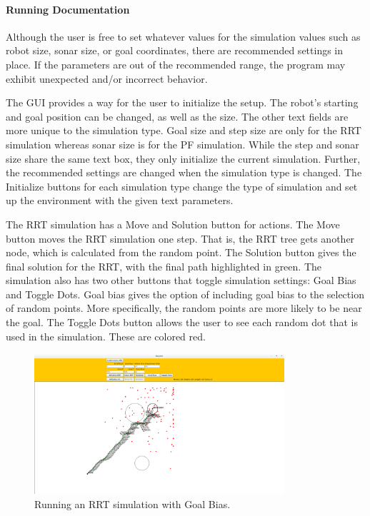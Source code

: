 \documentclass[12pt]{article}
\begin{document}
\paragraph*{Running Documentation}
Although the user is free to set whatever values for the simulation values such as robot size, sonar size, or goal coordinates, there are recommended settings in place. If the parameters are out of the recommended range, the program may exhibit unexpected and/or incorrect behavior.

The GUI provides a way for the user to initialize the setup. The robot's starting and goal position can be changed, as well as the size. The other text fields are more unique to the simulation type. Goal size and step size are only for the RRT simulation whereas sonar size is for the PF simulation. While the step and sonar size share the same text box, they only initialize the current simulation. Further, the recommended settings are changed when the simulation type is changed. The Initialize buttons for each simulation type change the type of simulation and set up the environment with the given text parameters. 

The RRT simulation has a Move and Solution button for actions. The Move button moves the RRT simulation one step. That is, the RRT tree gets another node, which is calculated from the random point. The Solution button gives the final solution for the RRT, with the final path highlighted in green. The simulation also has two other buttons that toggle simulation settings: Goal Bias and Toggle Dots. Goal bias gives the option of including goal bias to the selection of random points. More specifically, the random points are more likely to be near the goal. The Toggle Dots button allows the user to see each random dot that is used in the simulation. These are colored red. 

\begin{figure}
\centering
\includegraphics[width=350]{goal_bias_rrt.png}
\caption{Running an RRT simulation with Goal Bias.}
\end{figure}
\end{document}
